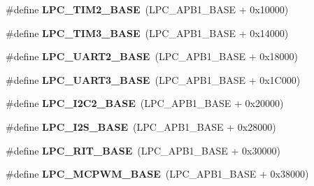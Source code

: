 \begin{DoxyCompactItemize}
\item 
\hypertarget{group___l_p_c17xx___system_gaf2375790bfdbe5e09c34321cf20d8bcc}{\#define {\bfseries \-L\-P\-C\-\_\-\-T\-I\-M2\-\_\-\-B\-A\-S\-E}~(\-L\-P\-C\-\_\-\-A\-P\-B1\-\_\-\-B\-A\-S\-E + 0x10000)}\label{group___l_p_c17xx___system_gaf2375790bfdbe5e09c34321cf20d8bcc}

\item 
\hypertarget{group___l_p_c17xx___system_ga4a15d8a4becdf0dd64a7e2fc01d9f4d3}{\#define {\bfseries \-L\-P\-C\-\_\-\-T\-I\-M3\-\_\-\-B\-A\-S\-E}~(\-L\-P\-C\-\_\-\-A\-P\-B1\-\_\-\-B\-A\-S\-E + 0x14000)}\label{group___l_p_c17xx___system_ga4a15d8a4becdf0dd64a7e2fc01d9f4d3}

\item 
\hypertarget{group___l_p_c17xx___system_ga8c3873ab74db743465b038c74b365281}{\#define {\bfseries \-L\-P\-C\-\_\-\-U\-A\-R\-T2\-\_\-\-B\-A\-S\-E}~(\-L\-P\-C\-\_\-\-A\-P\-B1\-\_\-\-B\-A\-S\-E + 0x18000)}\label{group___l_p_c17xx___system_ga8c3873ab74db743465b038c74b365281}

\item 
\hypertarget{group___l_p_c17xx___system_gac8dc517d5e03d4ca7666c18c89d5052e}{\#define {\bfseries \-L\-P\-C\-\_\-\-U\-A\-R\-T3\-\_\-\-B\-A\-S\-E}~(\-L\-P\-C\-\_\-\-A\-P\-B1\-\_\-\-B\-A\-S\-E + 0x1\-C000)}\label{group___l_p_c17xx___system_gac8dc517d5e03d4ca7666c18c89d5052e}

\item 
\hypertarget{group___l_p_c17xx___system_ga00796bd1f1fa200bbffcd9e7e8679eaa}{\#define {\bfseries \-L\-P\-C\-\_\-\-I2\-C2\-\_\-\-B\-A\-S\-E}~(\-L\-P\-C\-\_\-\-A\-P\-B1\-\_\-\-B\-A\-S\-E + 0x20000)}\label{group___l_p_c17xx___system_ga00796bd1f1fa200bbffcd9e7e8679eaa}

\item 
\hypertarget{group___l_p_c17xx___system_gacff8b54e3924910d381e6b8ba804050c}{\#define {\bfseries \-L\-P\-C\-\_\-\-I2\-S\-\_\-\-B\-A\-S\-E}~(\-L\-P\-C\-\_\-\-A\-P\-B1\-\_\-\-B\-A\-S\-E + 0x28000)}\label{group___l_p_c17xx___system_gacff8b54e3924910d381e6b8ba804050c}

\item 
\hypertarget{group___l_p_c17xx___system_ga52453209af89a83df47df77d262d9ab8}{\#define {\bfseries \-L\-P\-C\-\_\-\-R\-I\-T\-\_\-\-B\-A\-S\-E}~(\-L\-P\-C\-\_\-\-A\-P\-B1\-\_\-\-B\-A\-S\-E + 0x30000)}\label{group___l_p_c17xx___system_ga52453209af89a83df47df77d262d9ab8}

\item 
\hypertarget{group___l_p_c17xx___system_gad8a41dc802e3ea0ba9457d42a6927c03}{\#define {\bfseries \-L\-P\-C\-\_\-\-M\-C\-P\-W\-M\-\_\-\-B\-A\-S\-E}~(\-L\-P\-C\-\_\-\-A\-P\-B1\-\_\-\-B\-A\-S\-E + 0x38000)}\label{group___l_p_c17xx___system_gad8a41dc802e3ea0ba9457d42a6927c03}


\end{DoxyCompactItemize}
